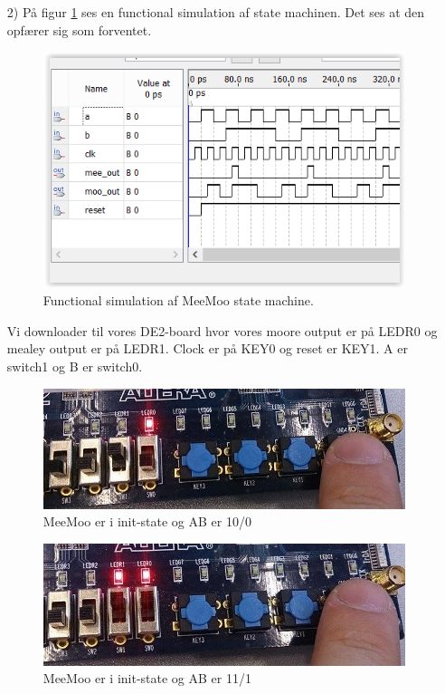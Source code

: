 \begin{enumerate}
\begin{lstlisting}[caption={Kode for MeeMoo state machine},label={lst:MeeMooSM}]
\end{lstlisting}
\item[2)]
På figur \ref{fig:meemoofuncsim} ses en functional simulation af state machinen. Det ses at den opfærer sig som forventet.
\begin{figure}[h]
	\centering
	\includegraphics[scale=0.7]{pictures/Oevelse7/opg1/meemoofuncsim.JPG}
	\caption{Functional simulation af MeeMoo state machine.}
	\label{fig:meemoofuncsim}
\end{figure}

Vi downloader til vores DE2-board hvor vores moore output er på LEDR0 og mealey output er på LEDR1. Clock er på KEY0 og reset er KEY1. A er switch1 og B er switch0.
\begin{figure}[h]
	\centering
	\includegraphics[scale=0.7]{pictures/Oevelse7/opg1/BA100MooMeeINIT.JPG}
	\caption{MeeMoo er i init-state og AB er 10/0}
	\label{fig:BA100MooMeeINIT}
\end{figure}
		
\begin{figure}[h]
	\centering
	\includegraphics[scale=0.75]{pictures/Oevelse7/opg1/BA111MooMeeINIT.JPG}
	\caption{MeeMoo er i init-state og AB er 11/1}
	\label{fig:BA111MooMeeINIT}
\end{figure}



\end{enumerate}
